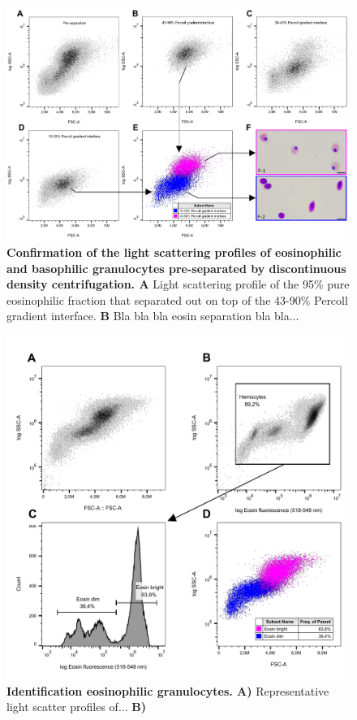 \begin{figure}[!ht]
    \centering
    \includegraphics[width=1.0\textwidth]{figures/Method development/PERCOLL SEP II final.pdf}
    \caption{\textbf{Confirmation of the light scattering profiles of eosinophilic and basophilic granulocytes pre-separated by discontinuous density centrifugation. A} Light scattering profile of the 95\% pure eosinophilic fraction that separated out on top of the 43-90\% Percoll gradient interface. \textbf{B} Bla bla bla eosin separation bla bla...}
    \label{fig:Percoll-dotplots}
\end{figure}



\begin{figure}[!ht]
    \centering
    \includegraphics[width=1.0\textwidth]{figures/Method development/Eosin exp figure for LaTeX.pdf}
    \caption{\textbf{Identification eosinophilic granulocytes. A)} Representative light scatter profiles of... \textbf{B)} }
    \label{fig:eosin_exp2}
\end{figure}

